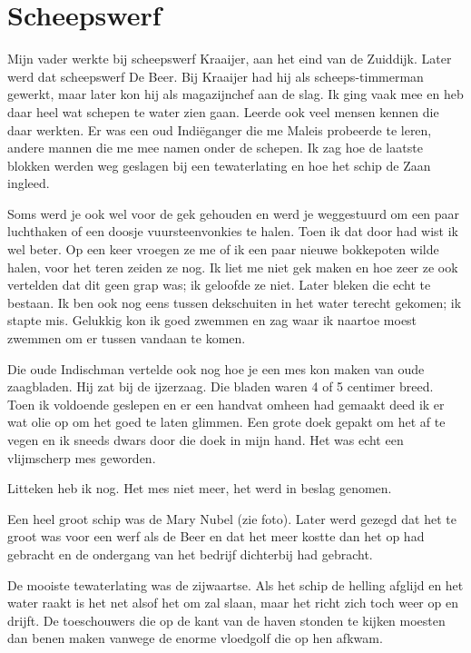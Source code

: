 \documentclass[10pt,twoside,openright]{memoir}
\begin{document}
\chapter{Scheepswerf} %
\label{cha:scheepswerf}

Mijn vader werkte bij scheepswerf Kraaijer, aan het eind van de Zuiddijk. Later werd dat scheepswerf De Beer. Bij Kraaijer had hij als scheeps-timmerman gewerkt, maar later kon hij als magazijnchef aan de slag. Ik ging vaak mee en heb daar heel wat schepen te water zien gaan. Leerde ook veel mensen kennen die daar werkten. Er was een oud Indiëganger die me Maleis probeerde te leren, andere mannen die me mee namen onder de schepen. Ik zag hoe de laatste blokken werden weg geslagen bij een tewaterlating en hoe het schip de Zaan ingleed. 

Soms werd je ook wel voor de gek gehouden en werd je weggestuurd om een paar luchthaken of een doosje vuursteenvonkies te halen. Toen ik dat door had wist ik wel beter. Op een keer vroegen ze me of ik een paar nieuwe bokkepoten wilde halen, voor het teren zeiden ze nog. Ik liet me niet gek maken en hoe zeer ze ook vertelden dat dit geen grap was; ik geloofde ze niet. Later bleken die echt te bestaan. Ik ben ook nog eens tussen dekschuiten in het water terecht gekomen; ik stapte mis. Gelukkig kon ik goed zwemmen en zag waar ik naartoe moest zwemmen om er tussen vandaan te komen. 

Die oude Indischman vertelde ook nog hoe je een mes kon maken van oude zaagbladen. Hij zat bij de ijzerzaag. Die bladen waren 4 of 5 centimer breed. Toen ik voldoende geslepen en er een handvat omheen had gemaakt deed ik er wat olie op om het goed te laten glimmen. Een grote doek gepakt om het af te vegen en ik sneeds dwars door die doek in mijn hand. Het was echt een vlijmscherp mes geworden. 

Litteken heb ik nog. Het mes niet meer, het werd in beslag genomen.

Een heel groot schip was de Mary Nubel (zie foto). Later werd gezegd dat het te groot was voor een werf als de Beer en dat het meer kostte dan het op had gebracht en de ondergang van het bedrijf dichterbij had gebracht. 

De mooiste tewaterlating was de zijwaartse. Als het schip de helling afglijd en het water raakt is het net alsof het om zal slaan, maar het richt zich toch weer op en drijft. De toeschouwers die op de kant van de haven stonden te kijken moesten dan benen maken vanwege de enorme vloedgolf die op hen afkwam.
\end{document}
